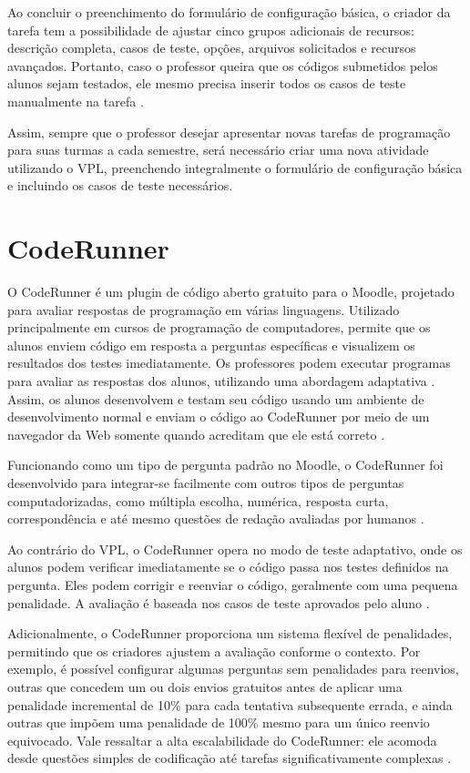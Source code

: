 Ao concluir o preenchimento do formulário de configuração básica, o criador da tarefa tem a possibilidade de ajustar cinco grupos adicionais de recursos: descrição completa, casos de teste, opções, arquivos solicitados e recursos avançados. Portanto, caso o professor queira que os códigos submetidos pelos alunos sejam testados, ele mesmo precisa inserir todos os casos de teste manualmente na tarefa \cite{vpl}.

Assim, sempre que o professor desejar apresentar novas tarefas de programação para suas turmas a cada semestre, será necessário criar uma nova atividade utilizando o VPL, preenchendo integralmente o formulário de configuração básica e incluindo os casos de teste necessários.

\section{CodeRunner}

O CodeRunner é um plugin de código aberto gratuito para o Moodle, projetado para avaliar respostas de programação em várias linguagens. Utilizado principalmente em cursos de programação de computadores, permite que os alunos enviem código em resposta a perguntas específicas e visualizem os resultados dos testes imediatamente. Os professores podem executar programas para avaliar as respostas dos alunos, utilizando uma abordagem adaptativa \cite{coderunner}. Assim, os alunos desenvolvem e testam seu código usando um ambiente de desenvolvimento normal e enviam o código ao CodeRunner por meio de um navegador da Web somente quando acreditam que ele está correto \cite[p.~47]{lobbharlow}.

Funcionando como um tipo de pergunta padrão no Moodle, o CodeRunner foi desenvolvido para integrar-se facilmente com outros tipos de perguntas computadorizadas, como múltipla escolha, numérica, resposta curta, correspondência e até mesmo questões de redação avaliadas por humanos \cite[p.~48]{lobbharlow}. 

Ao contrário do VPL, o CodeRunner opera no modo de teste adaptativo, onde os alunos podem verificar imediatamente se o código passa nos testes definidos na pergunta. Eles podem corrigir e reenviar o código, geralmente com uma pequena penalidade. A avaliação é baseada nos casos de teste aprovados pelo aluno \cite{moodle}.

Adicionalmente, o CodeRunner proporciona um sistema flexível de penalidades, permitindo que os criadores ajustem a avaliação conforme o contexto. Por exemplo, é possível configurar algumas perguntas sem penalidades para reenvios, outras que concedem um ou dois envios gratuitos antes de aplicar uma penalidade incremental de 10\% para cada tentativa subsequente errada, e ainda outras que impõem uma penalidade de 100\% mesmo para um único reenvio equivocado. Vale ressaltar a alta escalabilidade do CodeRunner: ele acomoda desde questões simples de codificação até tarefas significativamente complexas \cite[p.~48]{lobbharlow}.
 
